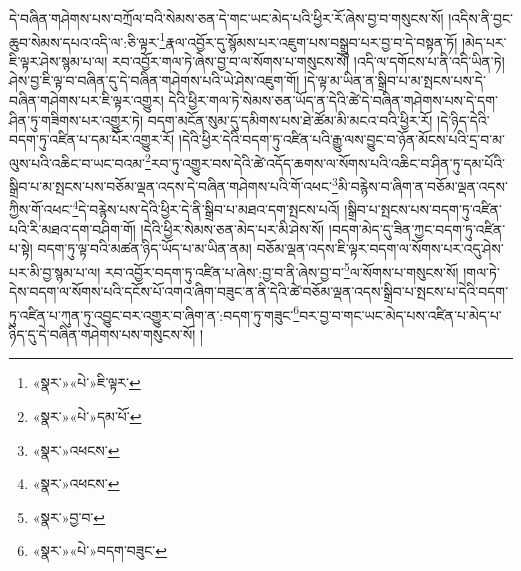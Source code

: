 དེ་བཞིན་གཤེགས་པས་བཀྲོལ་བའི་སེམས་ཅན་དེ་གང་ཡང་མེད་པའི་ཕྱིར་རོ་ཞེས་བྱ་བ་གསུངས་སོ། །འདིས་ནི་བྱང་ཆུབ་སེམས་དཔའ་འདི་ལ་:ཅི་ལྟར་\footnote{«སྣར་»«པེ་»ཇི་ལྟར་}རྣལ་འབྱོར་དུ་སྙོམས་པར་འཇུག་པས་བསྒྲུབ་པར་བྱ་བ་དེ་བསྟན་ཏོ། །མེད་པར་ཇི་ལྟར་ཤེས་སྙམ་པ་ལ། རབ་འབྱོར་གལ་ཏེ་ཞེས་བྱ་བ་ལ་སོགས་པ་གསུངས་སོ། །འདི་ལ་དགོངས་པ་ནི་འདི་ཡིན་ཏེ། ཤེས་བྱ་ཇི་ལྟ་བ་བཞིན་དུ་དེ་བཞིན་གཤེགས་པའི་ཡེ་ཤེས་འཇུག་གོ། །དེ་ལྟ་མ་ཡིན་ན་སྒྲིབ་པ་མ་སྤངས་པས་དེ་བཞིན་གཤེགས་པར་ཇི་ལྟར་འགྱུར། དེའི་ཕྱིར་གལ་ཏེ་སེམས་ཅན་ཡོད་ན་དེའི་ཚེ་དེ་བཞིན་གཤེགས་པས་དེ་དག་ཤིན་ཏུ་གཟིགས་པར་འགྱུར་ཏེ། བདག་མངོན་སུམ་དུ་དམིགས་པས་ཐེ་ཚོམ་མི་མངའ་བའི་ཕྱིར་རོ། །དེ་ཉིད་དེའི་བདག་ཏུ་འཛིན་པ་དམ་པོར་འགྱུར་རོ། །དེའི་ཕྱིར་དེའི་བདག་ཏུ་འཛིན་པའི་རྒྱུ་ལས་བྱུང་བ་ཉོན་མོངས་པའི་དྲ་བ་མ་ལུས་པའི་འཆིང་བ་ཡང་བའམ་\footnote{«སྣར་»«པེ་»དམ་པོ་}རབ་ཏུ་འགྱུར་བས་དེའི་ཚེ་འདོད་ཆགས་ལ་སོགས་པའི་འཆིང་བ་ཤིན་ཏུ་དམ་པོའི་སྒྲིབ་པ་མ་སྤངས་པས་བཅོམ་ལྡན་འདས་དེ་བཞིན་གཤེགས་པའི་གོ་འཕང་\footnote{«སྣར་»འཕངས་}མི་བརྙེས་བ་ཞིག་ན་བཅོམ་ལྡན་འདས་ཀྱིས་གོ་འཕང་\footnote{«སྣར་»འཕངས་}དེ་བརྙེས་པས་དེའི་ཕྱིར་དེ་ནི་སྒྲིབ་པ་མཐའ་དག་སྤངས་པའོ། །སྒྲིབ་པ་སྤངས་པས་བདག་ཏུ་འཛིན་པའི་རི་མཐའ་དག་བཤིག་གོ། །དེའི་ཕྱིར་སེམས་ཅན་མེད་པར་མི་ཤེས་སོ། །བདག་མེད་དུ་ཟིན་ཀྱང་བདག་ཏུ་འཛིན་པ་སྟེ། བདག་ཏུ་ལྟ་བའི་མཚན་ཉིད་ཡོད་པ་མ་ཡིན་ནམ། བཅོམ་ལྡན་འདས་ཇི་ལྟར་བདག་ལ་སོགས་པར་འདུ་ཤེས་པར་མི་བྱ་སྙམ་པ་ལ། རབ་འབྱོར་བདག་ཏུ་འཛིན་པ་ཞེས་:བྱ་བ་ནི་ཞེས་བྱ་བ་\footnote{«སྣར་»བྱ་བ་}ལ་སོགས་པ་གསུངས་སོ། །གལ་ཏེ་དེས་བདག་ལ་སོགས་པའི་དངོས་པོ་འགའ་ཞིག་བཟུང་ན་ནི་དེའི་ཚེ་བཅོམ་ལྡན་འདས་སྒྲིབ་པ་སྤངས་པ་དེའི་བདག་ཏུ་འཛིན་པ་ཀུན་ཏུ་འབྱུང་བར་འགྱུར་བ་ཞིག་ན་:བདག་ཏུ་གཟུང་\footnote{«སྣར་»«པེ་»བདག་བཟུང་}བར་བྱ་བ་གང་ཡང་མེད་པས་འཛིན་པ་མེད་པ་ཉིད་དུ་དེ་བཞིན་གཤེགས་པས་གསུངས་སོ། །
